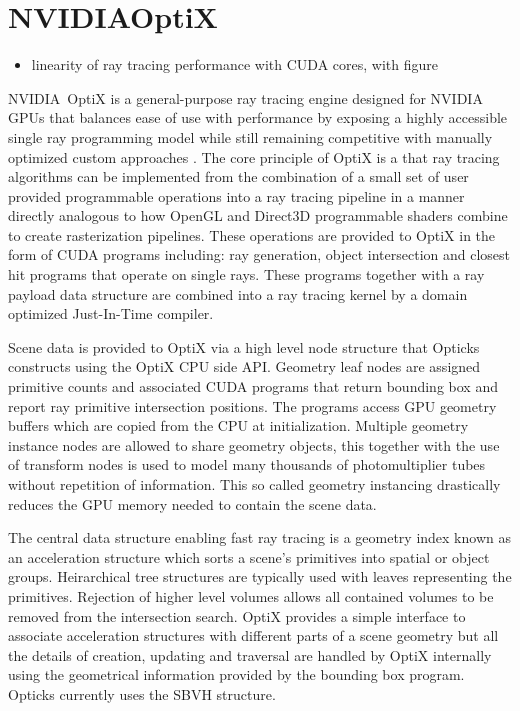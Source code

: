 \documentclass[a4paper]{jpconf}
\begin{document}
\section{NVIDIA\textregistered OptiX\texttrademark}

\begin{itemize}
\item linearity of ray tracing performance with CUDA cores, with figure
\end{itemize}

NVIDIA\textregistered\ OptiX\texttrademark \cite{optixPaper} \cite{optixSite} 
is a general-purpose ray tracing engine designed for NVIDIA GPUs
that balances ease of use with performance by exposing a highly accessible 
single ray programming model while still remaining competitive with manually 
optimized custom approaches \cite{optixPaper} \cite{understanding}.  
The core principle of OptiX is a that ray tracing algorithms can be implemented 
from the combination of a small set of user provided programmable operations
into a ray tracing pipeline in a manner directly analogous to how OpenGL 
and Direct3D programmable shaders combine to create rasterization pipelines.
These operations are provided to OptiX in the form of CUDA programs \cite{cudaPaper} \cite{cudaURL} 
including: ray generation, object intersection and closest hit programs that operate on 
single rays. These programs together with a ray payload data structure are combined 
into a ray tracing kernel by a domain optimized Just-In-Time compiler.

Scene data is provided to OptiX via a high level node structure that 
Opticks constructs using the OptiX CPU side API. 
Geometry leaf nodes are assigned primitive counts 
and associated CUDA programs that return bounding box and 
report ray primitive intersection positions. 
The programs access GPU geometry buffers which are copied from the CPU at initialization.
Multiple geometry instance nodes are allowed to share geometry objects, this 
together with the use of transform nodes is used to model many thousands of  
photomultiplier tubes without repetition of information. This so called geometry 
instancing drastically reduces the GPU memory needed to contain the scene data.

The central data structure enabling fast ray tracing is a geometry index
known as an acceleration structure which sorts a scene’s primitives 
into spatial or object groups. 
Heirarchical tree structures are typically used
with leaves representing the primitives.  Rejection of higher level
volumes allows all contained volumes to be removed from the intersection
search. OptiX provides a simple interface to associate acceleration structures 
with different parts of a scene geometry but all the details of creation, updating 
and traversal are handled by OptiX internally using the geometrical information provided by the 
bounding box program. Opticks currently uses the SBVH structure\cite{SBVH}.
\end{document}
